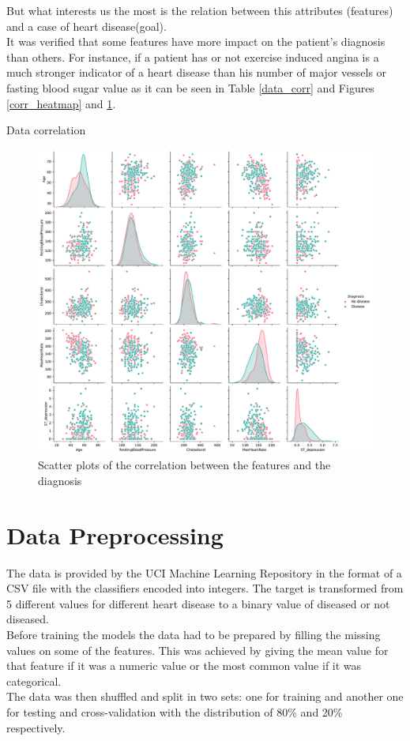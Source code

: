 \documentclass[conference]{IEEEtran}
\begin{document}
But what interests us the most is the relation between this attributes (features) and a case of heart disease(goal).
\\It was verified that some features have more impact on the patient's diagnosis than others. For instance, if a patient has or not exercise induced angina is a much stronger indicator of a heart disease than his number of major vessels or fasting blood sugar value as it can be seen in Table \ref{data_corr} and Figures \ref{corr_heatmap} and \ref{corr_scatter}.

\begin{table}[htbp]
    \caption{Data correlation}
    \begin{center}
        
        \label{data_corr}
    \end{center}
\end{table}

\begin{figure}[H]
    \centerline{\includegraphics[width=\linewidth]{images/correlation_scatter.pdf}}
    \caption{Scatter plots of the correlation between the features and the diagnosis}
    \label{corr_scatter}
\end{figure}

\section{Data Preprocessing}
The data is provided by the UCI Machine Learning Repository\cite{mlr} in the format of a CSV file with the classifiers encoded into integers. The target is transformed from 5 different values for different heart disease to a binary value of diseased or not diseased.\\
Before training the models the data had to be prepared by filling the missing values on some of the features. This was achieved by giving the mean value for that feature if it was a numeric value or the most common value if it was categorical.\\
The data was then shuffled and split in two sets: one for training and another one for testing and cross-validation with the distribution of 80\% and 20\% respectively.
\end{document}
